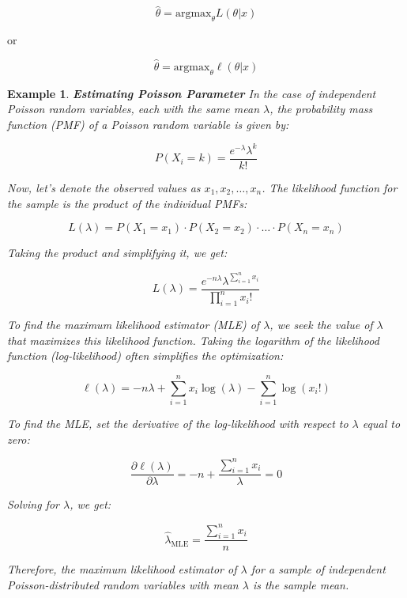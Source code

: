\documentclass[12pt,a4paper]{article}
\theoremstyle{example}
\newtheorem{example}{Example}
\theoremstyle{definition}
\theoremstyle{theorem}
\begin{document}
\[ \hat{\theta} = \text{argmax}_{\theta} L(\theta | x) \]

or

\[ \hat{\theta} = \text{argmax}_{\theta} \ell(\theta | x) \]

\begin{example}{\textbf{Estimating Poisson Parameter}}
    In the case of independent Poisson random variables, each with the same mean $\lambda$, the probability mass function (PMF) of a Poisson random variable is given by:

\[ P(X_i=k) = \frac{e^{-\lambda} \lambda^k}{k!} \]

Now, let's denote the observed values as $x_1, x_2, \ldots, x_n$. The likelihood function for the sample is the product of the individual PMFs:

\[ L(\lambda) = P(X_1=x_1) \cdot P(X_2=x_2) \cdot \ldots \cdot P(X_n=x_n) \]

Taking the product and simplifying it, we get:

\[ L(\lambda) = \frac{e^{-n\lambda} \lambda^{\sum_{i=1}^{n} x_i}}{\prod_{i=1}^{n} x_i!} \]

To find the maximum likelihood estimator (MLE) of $\lambda$, we seek the value of $\lambda$ that maximizes this likelihood function. Taking the logarithm of the likelihood function (log-likelihood) often simplifies the optimization:

\[ \ell(\lambda) = -n\lambda + \sum_{i=1}^{n} x_i \log(\lambda) - \sum_{i=1}^{n} \log(x_i!) \]

To find the MLE, set the derivative of the log-likelihood with respect to $\lambda$ equal to zero:

\[ \frac{\partial \ell(\lambda)}{\partial \lambda} = -n + \frac{\sum_{i=1}^{n} x_i}{\lambda} = 0 \]

Solving for $\lambda$, we get:

\[ \hat{\lambda}_{\text{MLE}} = \frac{\sum_{i=1}^{n} x_i}{n} \]

Therefore, the maximum likelihood estimator of $\lambda$ for a sample of independent Poisson-distributed random variables with mean $\lambda$ is the sample mean.

\end{example}
\end{document}
